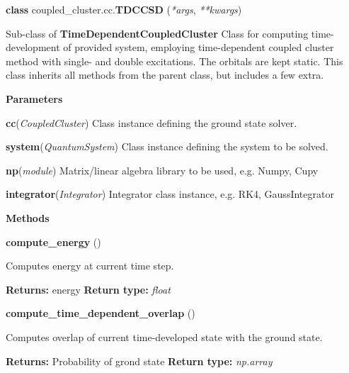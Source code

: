 \begin{tcolorbox}
    {\selectfont
    \textbf{class} coupled\_cluster.cc.\textbf{TDCCSD}
    (\emph{*args}, \emph{**kwargs})

    \vspace{1em}
    Sub-class of \textbf{TimeDependentCoupledCluster}
    Class for computing time-development of provided system, employing time-dependent 
    coupled cluster method with single- and double excitations. The orbitals are kept 
    static. This class inherits all methods from the parent class, but includes 
    a few extra.

    \vspace{1em}
    \textbf{Parameters}

    \hspace{2em}\textbf{cc}(\emph{CoupledCluster})
        Class instance defining the ground state solver.

    \hspace{2em}\textbf{system}(\emph{QuantumSystem}) 
        Class instance defining the system to be solved.

    \hspace{2em}\textbf{np}(\emph{module})
        Matrix/linear algebra library to be used, e.g. Numpy, Cupy
    
    \hspace{2em}\textbf{integrator}(\emph{Integrator})
        Integrator class instance, e.g. RK4, GaussIntegrator

    \vspace{1em}
    \textbf{Methods}

    \hspace{2em} \textbf{compute\_energy} ()
        \begin{adjustwidth}{4em}{}
        Computes energy at current time step.

        \textbf{Returns:} energy
        \textbf{Return type:} \emph{float}
        \end{adjustwidth}

    \hspace{2em} \textbf{compute\_time\_dependent\_overlap} ()
        \begin{adjustwidth}{4em}{}
        Computes overlap of current time-developed state with the ground state.

        \textbf{Returns:} Probability of grond state 
        \textbf{Return type:} \emph{np.array}
        \end{adjustwidth}

    } 
\end{tcolorbox}